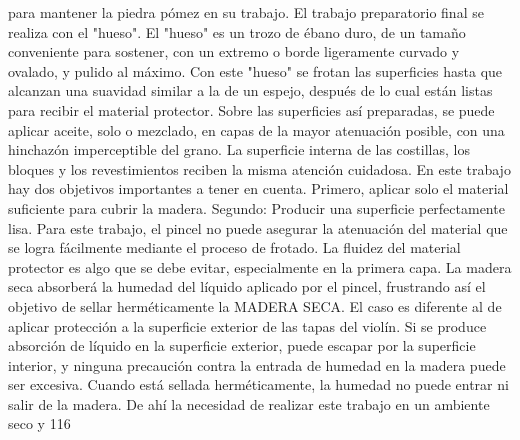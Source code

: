 para mantener la piedra pómez en su trabajo. El trabajo preparatorio final se realiza con el "hueso". El "hueso" es un trozo de ébano duro, de un tamaño conveniente para sostener, con un extremo o borde ligeramente curvado y ovalado, y pulido al máximo. Con este "hueso" se frotan las superficies hasta que alcanzan una suavidad similar a la de un espejo, después de lo cual están listas para recibir el material protector. Sobre las superficies así preparadas, se puede aplicar aceite, solo o mezclado, en capas de la mayor atenuación posible, con una hinchazón imperceptible del grano. La superficie interna de las costillas, los bloques y los revestimientos reciben la misma atención cuidadosa.
En este trabajo hay dos objetivos importantes a tener en cuenta. Primero, aplicar solo el material suficiente para cubrir la madera. Segundo: Producir una superficie perfectamente lisa. Para este trabajo, el pincel no puede asegurar la atenuación del material que se logra fácilmente mediante el proceso de frotado. La fluidez del material protector es algo que se debe evitar, especialmente en la primera capa. La madera seca absorberá la humedad del líquido aplicado por el pincel, frustrando así el objetivo de sellar herméticamente la MADERA SECA. El caso es diferente al de aplicar protección a la superficie exterior de las tapas del violín. Si se produce absorción de líquido en la superficie exterior, puede escapar por la superficie interior, y ninguna precaución contra la entrada de humedad en la madera puede ser excesiva. Cuando está sellada herméticamente, la humedad no puede entrar ni salir de la madera. De ahí la necesidad de realizar este trabajo en un ambiente seco y
116

